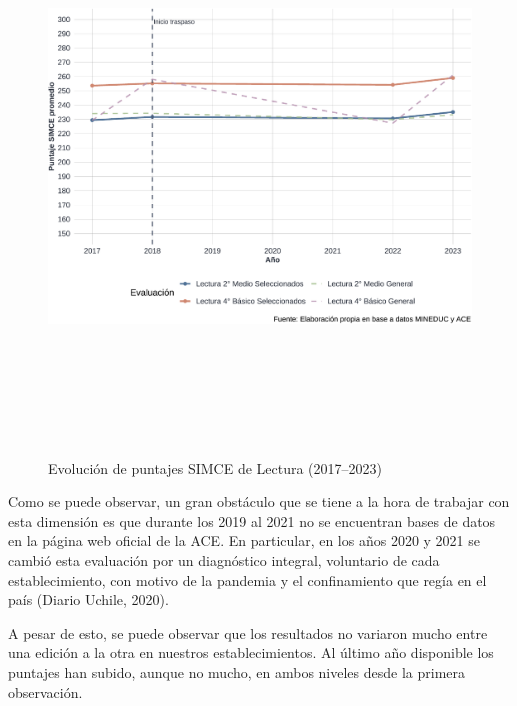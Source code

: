 \documentclass[
  12pt,
  letterpaper,
]{article}
\begin{document}
\begin{figure}

{\centering \includegraphics[width=0.8\linewidth,height=6in]{tesis_ver_final_files/figure-latex/grafico-simce-l-1} 

}

\caption{Evolución de puntajes SIMCE de Lectura (2017–2023)}\label{fig:grafico-simce-l}
\end{figure}

Como se puede observar, un gran obstáculo que se tiene a la hora de trabajar con esta dimensión es que durante los 2019 al 2021 no se encuentran bases de datos en la página web oficial de la ACE.
En particular, en los años 2020 y 2021 se cambió esta evaluación por un diagnóstico integral, voluntario de cada establecimiento, con motivo de la pandemia y el confinamiento que regía en el país (Diario Uchile, 2020).

A pesar de esto, se puede observar que los resultados no variaron mucho entre una edición a la otra en nuestros establecimientos.
Al último año disponible los puntajes han subido, aunque no mucho, en ambos niveles desde la primera observación.
\end{document}
